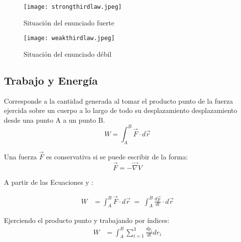 \documentclass[/home/hernan/Documentos/Apuntes_mecanica_teorica/main.tex]{subfiles}
\begin{document}
	\begin{marginfigure}
		\begin{figure}[H]
			\centering
			\texttt{[image: strongthirdlaw.jpeg]}
			\caption{Situación del enunciado fuerte}
			\label{fig: Nthirdstrong}
		\end{figure}
	\end{marginfigure}

	\begin{marginfigure}
		\begin{figure}[H]
			\centering
			\texttt{[image: weakthirdlaw.jpeg]}
			\caption{Situación del enunciado débil}
			\label{fig: Nthirdweak}
		\end{figure}
	\end{marginfigure}

	\subsection{Trabajo y Energía}

	\begin{definition} Corresponde a la cantidad generada al tomar el producto punto de la fuerza ejercida sobre un cuerpo a lo largo de todo su desplazamiento desplazamiento desde una punto A a un punto B.
		\begin{equation}
			W = \int_{A}^{B} \vec{F} \cdot d\vec{r}
			\label{eq: work}
		\end{equation}
	\end{definition}

	\begin{definition} Una fuerza $\vec{F}$ es conservativa si se puede escribir de la forma:
		\begin{equation}
			\vec{F} = - \vec{\nabla}V
			\label{eq: conservativeforce}
		\end{equation}
	\end{definition}

	A partir de las Ecuaciones  y :

	\begin{align*}
		W & = \int_{A}^{B} \vec{F} \cdot d\vec{r} \; = \; \int_{A}^{B}  \frac{d \vec{p}}{dt} \cdot d\vec{r}
	\end{align*}

	Ejerciendo el producto punto y trabajando por índices:
	\begin{align*}
		W & = \int_{A}^{B} \sum_{i=1}^{3} \frac{d p_{i}}{dt}dr_{i}
	\end{align*}
\end{document}
